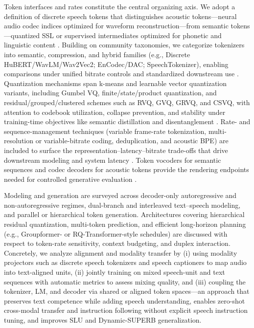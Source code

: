 \documentclass{article}
\begin{document}
Token interfaces and rates constitute the central organizing axis. We adopt a definition of discrete speech tokens that distinguishes acoustic tokens—neural audio codec indices optimized for waveform reconstruction—from semantic tokens—quantized SSL or supervised intermediates optimized for phonetic and linguistic content \cite{guo2025recentadvancesdiscretespeechtokensreview}. Building on community taxonomies, we categorize tokenizers into semantic, compression, and hybrid families (e.g., Discrete HuBERT/WavLM/Wav2Vec2; EnCodec/DAC; SpeechTokenizer), enabling comparisons under unified bitrate controls and standardized downstream use \cite{mousavi2024dasbdiscreteaudiospeechbenchmark}. Quantization mechanisms span k-means and learnable vector quantization variants, including Gumbel VQ, finite/state/product quantization, and residual/grouped/clustered schemes such as RVQ, GVQ, GRVQ, and CSVQ, with attention to codebook utilization, collapse prevention, and stability under training-time objectives like semantic distillation and disentanglement \cite{guo2025recentadvancesdiscretespeechtokensreview}. Rate- and sequence-management techniques (variable frame-rate tokenization, multi-resolution or variable-bitrate coding, deduplication, and acoustic BPE) are included to surface the representation–latency–bitrate trade-offs that drive downstream modeling and system latency \cite{guo2025recentadvancesdiscretespeechtokensreview}. Token vocoders for semantic sequences and codec decoders for acoustic tokens provide the rendering endpoints needed for controlled generative evaluation .



Modeling and generation are surveyed across decoder-only autoregressive and non-autoregressive regimes, dual-branch and interleaved text–speech modeling, and parallel or hierarchical token generation. Architectures covering hierarchical residual quantization, multi-token prediction, and efficient long-horizon planning (e.g., Groupformer- or RQ-Transformer-style schedules) are discussed with respect to token-rate sensitivity, context budgeting, and duplex interaction. Concretely, we analyze alignment and modality transfer by (i) using modality projectors such as discrete speech tokenizers and speech captioners to map audio into text-aligned units, (ii) jointly training on mixed speech-unit and text sequences with automatic metrics to assess mixing quality, and (iii) coupling the tokenizer, LM, and decoder via shared or aligned token spaces—an approach that preserves text competence while adding speech understanding, enables zero-shot cross-modal transfer and instruction following without explicit speech instruction tuning, and improves SLU and Dynamic-SUPERB generalization. \cite{lu2024destaenhancingspeechlanguagemodelsthroug,entry2025towardjointlanguagemodelingspeechunitste}
\end{document}
